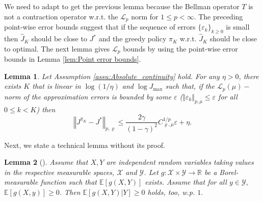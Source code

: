 \documentclass[12pt,technote,onecolumn]{IEEEtran}
\newtheorem{lemma}{Lemma}
\begin{document}
\begin{IEEEproof}
	We need to adapt \cite[Lemma 3]{munos2008finite} to get the previous
	lemma because the Bellman operator $T$ is not a contraction operator
	w.r.t. the $\mathcal{L}_{p}$ norm for $1\leq p<\infty$.
	The preceding point-wise error bounds suggest that if the sequence
	of errors $\{ \varepsilon_{k}\} _{k\geq0}$ is small then
	$\widehat{J}_{K}$ should be close to $J^{*}$ and the greedy policy
	$\widehat{\pi}_{K}$ w.r.t. $\widehat{J}_{K}$ should be
	close to optimal. The next lemma gives $\mathcal{L}_{p}$ bounds by
	using the point-wise error bounds in Lemma \ref{lem:Point error bounds}.
	\begin{lemma}
		\label{lem:Lp bounds} Let Assumption \ref{assu:Absolute_continuity}
		hold. For any $\eta>0$, there exists $K$ that is linear in $\log\left(1/\eta\right)$
		and $\log J_{\max}$ such that, if the $\mathcal{L}_{p}\left(\mu\right)-$norm
		of the approximation errors is bounded by some $\varepsilon$ ($\Vert \varepsilon_{k}\Vert _{p,\mu}\leq\varepsilon$
		for all $0\leq k<K$) then		
		$$
		\left\Vert J^{\widehat{\pi}_{K}}-J^{*}\right\Vert _{p,\varrho}\leq\frac{2\gamma}{\left(1-\gamma\right)^{2}}C_{\varrho,\mu}^{1/p}\varepsilon+\eta.
		$$
	\end{lemma}
	
	Next, we state a technical lemma without its proof. 
		\begin{lemma}[{\cite[Lemma 5]{munos2008finite}}]
			\label{lem:Conditional expectation} Assume that $X,Y$ are independent
			random variables taking values in the respective measurable spaces,
			$\mathcal{X}$ and $\mathcal{Y}$. Let $g:\mathcal{X}\times\mathcal{Y}\rightarrow\mathbb{R}$
			be a Borel-measurable function such that $\mathbb{E}[g\left(X,Y\right)]$
			exists. Assume that for all $y\in\mathcal{Y},$ $\mathbb{E}[g\left(X,y\right)]\geq0$.
			Then $\mathbb{E}[g(X,Y)|Y]\geq0$ holds, too,
			w.p. $1.$
		\end{lemma}
		

\end{IEEEproof}
\end{document}
